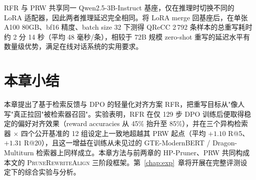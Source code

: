 RFR 与 PRW 共享同一 Qwen2.5-3B-Instruct 基座，仅在推理时切换不同的 LoRA 适配器，因此两者推理延迟完全相同。将 LoRA merge 回基座后，在单张 A100 80GB、bf16 精度、batch size 32 下测得 QReCC 2\,792 条样本的总重写耗时约 2 分 14 秒（平均 48 毫秒/条），相较于 72B 规模 zero-shot 重写的延迟水平有数量级优势，满足在线对话系统的实用要求。

\section{本章小结}

本章提出了基于检索反馈与 DPO 的轻量化对齐方案 RFR，把重写目标从"像人写"真正拉回"被检索器召回"。实验表明，RFR 在仅 129 步 DPO 训练后便取得稳定的偏好对齐效果（reward accuracies 从 45\% 抬升至 85\%），并在三个异构检索器 $\times$ 四个公开基准的 12 组设定上一致地超越其 PRW 起点（平均 $+1.10$ R@5、$+1.31$ R@20），且这一增益在训练从未见过的 GTE-ModernBERT / Dragon-Multiturn 检索器上同样成立。本章方法与前两章的 HP-Pruner、PRW 共同构成本文的 \textsc{PruneRewriteAlign} 三阶段框架。第~\ref{chap:exp}~章将开展在完整评测设定下的综合实验与分析。
